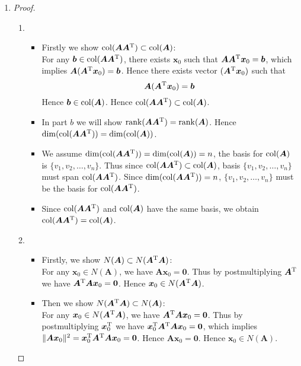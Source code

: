 \begin{enumerate}
\begin{proof}[Solution.]
\begin{enumerate}
\[\begin{bmatrix}
\end{bmatrix}+d\begin{bmatrix}
1&0\\0&1
\end{bmatrix}
\]
where $b,d\in\mathbb{R}$, it will transform the unit square into another square. 
\end{enumerate}
\end{proof}
\item
\begin{proof}
\begin{enumerate}
\item
\begin{itemize}
\item
Firstly we show $\operatorname{col}(\bm A\bm A^{\mathrm T})\subset\operatorname{col}(\bm A)$:
\\ For any $\bm b\in\operatorname{col}(\bm A\bm A^{\mathrm T})$, there exists $\bm x_0$ such that $\bm A\bm A^{\mathrm T}\bm x_0=\bm b$, which implies $\bm A(\bm A^{\mathrm T}\bm x_0)=\bm b$. Hence there exists vector $(\bm A^{\mathrm T}\bm x_0)$ such that 
\[
\bm A(\bm A^{\mathrm T}\bm x_0)=\bm b
\]
Hence $\bm b\in\operatorname{col}(\bm A)$. Hence $\operatorname{col}(\bm A\bm A^{\mathrm T})\subset\operatorname{col}(\bm A)$.
\item
In part $b$ we will show $\operatorname{rank}(\bm A\bm A^{\mathrm T})=\operatorname{rank}(\bm A)$. Hence $\dim(\operatorname{col}(\bm A\bm A^{\mathrm T}))=\dim(\operatorname{col}(\bm A))$. 
\item
We assume $\dim(\operatorname{col}(\bm A\bm A^{\mathrm T}))=\dim(\operatorname{col}(\bm A))=n$, the basis for $\operatorname{col}(\bm A)$ is $\{v_1,v_2,\dots,v_n\}$. Thus since $\operatorname{col}(\bm A\bm A^{\mathrm T})\subset\operatorname{col}(\bm A)$, basis $\{v_1,v_2,\dots,v_n\}$ must span $\operatorname{col}(\bm A\bm A^{\mathrm T})$. Since $\dim(\operatorname{col}(\bm A\bm A^{\mathrm T}))=n$, $\{v_1,v_2,\dots,v_n\}$ must be the basis for $\operatorname{col}(\bm A\bm A^{\mathrm T})$.
\item
Since $\operatorname{col}(\bm A\bm A^{\mathrm T})$ and $\operatorname{col}(\bm A)$ have the same basis, we obtain $\operatorname{col}(\bm A\bm A^{\mathrm T})=\operatorname{col}(\bm A)$.
\end{itemize}
\item
\begin{itemize}
\item
Firstly, we show $N(\bm A)\subset N(\bm A^{\mathrm T}\bm A)$:\\
For any $\bm x_0\in N(\bm A)$, we have $\bm A\bm x_0=\bm 0$. Thus by postmultiplying $\bm A^{\mathrm T}$ we have $\bm A^{\mathrm T}\bm A\bm x_0=\bm 0$. Hence $\bm x_0\in N(\bm A^{\mathrm T}\bm A)$.
\item
Then we show $N(\bm A^{\mathrm T}\bm A)\subset N(\bm A)$:\\
For any $\bm x_0\in N(\bm A^{\mathrm T}\bm A)$, we have $\bm A^{\mathrm T}\bm A\bm x_0=\bm 0$. Thus by postmultiplying $\bm x_0^{\mathrm T}$ we have $\bm x_0^{\mathrm T}\bm A^{\mathrm T}\bm A\bm x_0=\bm 0$, which implies $\lVert \bm A\bm x_0\rVert^2=\bm x_0^{\mathrm T}\bm A^{\mathrm T}\bm A\bm x_0=\bm 0$. Hence $\bm A\bm x_0=\bm 0$. Hence $\bm x_0\in N(\bm A)$.

\end{itemize}
\end{enumerate}
\end{proof}
\end{enumerate}
